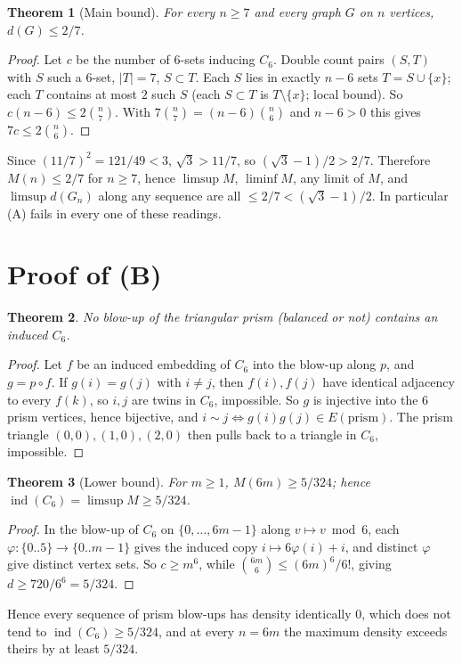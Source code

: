 \documentclass[11pt]{article}
\newtheorem{theorem}{Theorem}
\theoremstyle{definition}
\newcommand{\ind}{\operatorname{ind}}
\begin{document}
\begin{theorem}[Main bound]
For every $n \ge 7$ and every graph $G$ on $n$ vertices, $d(G) \le 2/7$.
\end{theorem}
\begin{proof}
Let $c$ be the number of $6$-sets inducing $C_6$. Double count pairs $(S,T)$ with $S$ such a
$6$-set, $|T| = 7$, $S \subset T$. Each $S$ lies in exactly $n-6$ sets $T = S\cup\{x\}$; each $T$ contains
at most $2$ such $S$ (each $S \subset T$ is $T\setminus\{x\}$; local bound). So
$c(n-6) \le 2\binom n7$. With $7\binom n7 = (n-6)\binom n6$ and $n-6>0$ this gives
$7c \le 2\binom n6$.
\end{proof}

Since $(11/7)^2 = 121/49 < 3$, $\sqrt3 > 11/7$, so $(\sqrt3-1)/2 > 2/7$. Therefore $M(n) \le 2/7$ for
$n\ge7$, hence $\limsup M$, $\liminf M$, any limit of $M$, and $\limsup d(G_n)$ along any sequence are
all $\le 2/7 < (\sqrt3-1)/2$. In particular (A) fails in every one of these readings.

\section*{Proof of (B)}
\begin{theorem}
No blow-up of the triangular prism (balanced or not) contains an induced $C_6$.
\end{theorem}
\begin{proof}
Let $f$ be an induced embedding of $C_6$ into the blow-up along $p$, and $g = p\circ f$. If
$g(i) = g(j)$ with $i\ne j$, then $f(i), f(j)$ have identical adjacency to every $f(k)$, so $i,j$ are
twins in $C_6$, impossible. So $g$ is injective into the $6$ prism vertices, hence bijective, and
$i\sim j \iff g(i)g(j) \in E(\text{prism})$. The prism triangle $(0,0),(1,0),(2,0)$ then pulls back to
a triangle in $C_6$, impossible.
\end{proof}

\begin{theorem}[Lower bound]
For $m\ge1$, $M(6m) \ge 5/324$; hence $\ind(C_6) = \limsup M \ge 5/324$.
\end{theorem}
\begin{proof}
In the blow-up of $C_6$ on $\{0,\dots,6m-1\}$ along $v\mapsto v \bmod 6$, each $\varphi\colon \{0..5\}\to\{0..m-1\}$
gives the induced copy $i\mapsto 6\varphi(i)+i$, and distinct $\varphi$ give distinct vertex sets. So
$c \ge m^6$, while $\binom{6m}{6} \le (6m)^6/6!$, giving $d \ge 720/6^6 = 5/324$.
\end{proof}
Hence every sequence of prism blow-ups has density identically $0$, which does not tend to
$\ind(C_6) \ge 5/324$, and at every $n = 6m$ the maximum density exceeds theirs by at least $5/324$.
\end{document}
